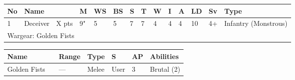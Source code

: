 \newpage
{}

\noindent
\begin{tabular}{||m{10pt} m{95pt} m{30pt} m{11pt} m{11pt} m{11pt} m{11pt} m{11pt} m{11pt} m{11pt} m{11pt} m{11pt} m{11pt} m{125pt}||}
\hline
No & Name & & M & WS & BS & S & T & W & I & A & LD & Sv & Type \\
\hline
1 & Deceiver & X pts & 9" & 5 & 5 & 7 & 7 & 4 & 4 & 4 & 10 & 4+ & Infantry (Monstrous)\\
\hline
\hline
\multicolumn{14}{||Z{532 pt}||}{Wargear: Golden Fists}\\
\hline
\end{tabular}

\noindent
\begin{tabular}{||m{140pt} m{0pt} m{31pt} m{55pt} m{12pt} m{12pt} m{210pt}||}
\hline
Name & & Range & Type & S & AP & Abilities \\
\hline
Golden Fists &  & — & Melee & User & 3 & Brutal (2) \\
\hline
\end{tabular}

